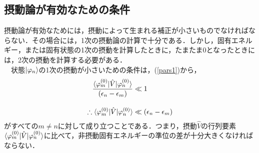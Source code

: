 %
\subsection{摂動論が有効なための条件}
摂動論が有効なためには，摂動によって生まれる補正が小さいものでなければならない．その場合には，1次の摂動論の計算で十分である．しかし，固有エネルギー，または固有状態の1次の摂動を計算したときに，たまたま$0$となったときには，2次の摂動を計算する必要がある．\\
　状態$\ket{\varphi_n}$の1次の摂動が小さいための条件は，(\ref{pars1})から，
　　\begin{align}\label{cond1}
 \frac{\braket{\varphi_{m}^{(0)}|\hat{V}|\varphi_{n}^{(0)}}}{(\epsilon_{n}-\epsilon_{m})}&\ll1\notag\\[10pt]
\therefore
\braket{\varphi_{m}^{(0)}|\hat{V}|\varphi_{n}^{(0)}}&\ll(\epsilon_{n}-\epsilon_{m})
\end{align}
がすべての$m\neq n$に対して成り立つことである．つまり，摂動$\hat{V}$の行列要素$\braket{\varphi_{m}^{(0)}|\hat{V}|\varphi_{n}^{(0)}}$に比べて，非摂動固有エネルギーの準位の差が十分大きくなければならない．











